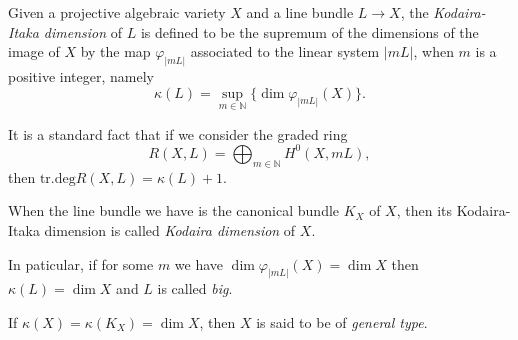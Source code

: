 \documentclass[12pt]{article}
\begin{document}
Given a projective algebraic variety $X$ and a line bundle $L\to X$,
the \emph{Kodaira-Itaka dimension} of $L$
is defined to be the supremum of the dimensions of the image of $X$
by the map $\varphi_{|mL|}$ associated to the linear system $|mL|$,
when $m$ is a positive integer, namely
\[
  \kappa(L)=\sup_{m\in\mathbb N}\{\dim\varphi_{|mL|}(X)\}.
\]

It is a standard fact that if we consider the graded ring
\[
  R(X,L)=\bigoplus_{m\in\mathbb N}H^0(X,mL), 
\]
then $\text{tr.deg} R(X,L)=\kappa(L)+1$.

When the line bundle we have is the canonical bundle $K_X$ of $X$,
then its Kodaira-Itaka dimension is called \emph{Kodaira dimension} of $X$.

In paticular, if for some $m$ we have $\dim\varphi_{|mL|}(X)=\dim X$
then $\kappa(L)=\dim X$ and $L$ is called \emph{big}.

If $\kappa(X)=\kappa(K_X)=\dim X$,
then $X$ is said to be of \emph{general type}.
\end{document}
